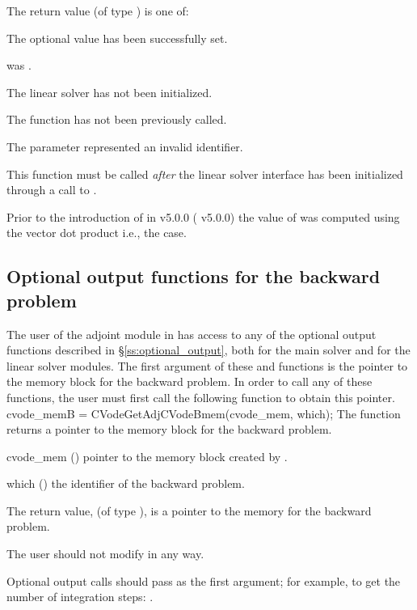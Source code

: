 {
  The return value  (of type ) is one of:
  \begin{args}
  \item[\Id{CVLS\_SUCCESS}]
    The optional value has been successfully set.
  \item[\Id{CVLS\_MEM\_NULL}]
     was .
  \item[\Id{CVLS\_LMEM\_NULL}]
    The {\cvls} linear solver has not been initialized.
  \item[\Id{CVLS\_NO\_ADJ}]
    The function  has not been previously called.
  \item[\Id{CVLS\_ILL\_INPUT}]
    The parameter  represented an invalid identifier.
  \end{args}
}
{
  This function must be called \emph{after} the {\cvls} linear solver
  interface has been initialized through a call to
  .

  Prior to the introduction of  in {\sundials} v5.0.0
  ({\cvodes} v5.0.0) the value of  was computed using the vector
  dot product i.e., the  case.
}



\subsection{Optional output functions for the backward problem}\label{ss:optional_output_b}
The user of the adjoint module in {\cvodes} has access to any of the optional
output functions described in \S\ref{ss:optional_output}, both for the main solver
and for the linear solver modules. The first argument of these  and
 functions is the pointer to the {\cvodes} memory block for the
backward problem. In order to call any of these functions, the user must first
call the following function to obtain this pointer.
{
  cvode\_memB = CVodeGetAdjCVodeBmem(cvode\_mem, which);
}
{
  The function  returns a pointer to the {\cvodes}
  memory block for the backward problem.
}
{
  \begin{args}
  \item[cvode\_mem] ()
    pointer to the {\cvodes} memory block created by .
  \item[which] ()
    the identifier of the backward problem.
  \end{args}
}
{
  The return value,  (of type ), is a pointer to the
  {\cvodes} memory for the backward problem.
}
{
  {\warn}The user should not modify  in any way.

  Optional output calls should pass  as the first argument;
  for example, to get the number of integration steps:
  .
}

